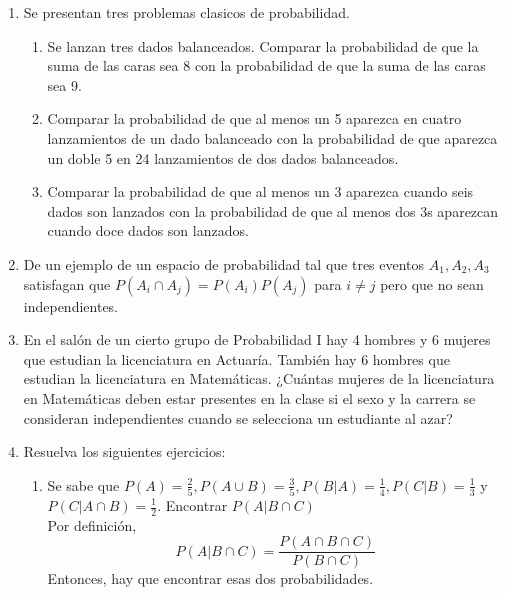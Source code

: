 \documentclass[12pt,a4paper]{report}
\begin{document}
\begin{enumerate}
   \item {
    Se presentan tres problemas clasicos de probabilidad.

    \begin{enumerate}[label=\alph*) ]
    \item{Se lanzan tres dados balanceados. Comparar la probabilidad de que la suma de las caras sea 8 con la probabilidad de que la suma de las caras sea 9.
    }\\

    \item{Comparar la probabilidad de que al menos un 5 aparezca en cuatro lanzamientos de un dado balanceado con la probabilidad de que aparezca un doble 5 en 24 lanzamientos de dos dados balanceados.} \\
    \item{Comparar la probabilidad de que al menos un 3 aparezca cuando seis dados son lanzados con la probabilidad de que al menos dos 3s aparezcan cuando doce dados son lanzados.}
    \end{enumerate}
	}


   \item {
   De un ejemplo de un espacio de probabilidad tal que tres eventos $A_{1},A_{2},A_{3}$ satisfagan que $P(A_{i}\cap A_{j})=P(A_{i})P(A_{j})$ para $i\neq j$ pero que no sean independientes.\\
	}

   \item {En el salón de un cierto grupo de Probabilidad I hay 4 hombres y 6 mujeres que estudian la licenciatura en Actuaría. También hay 6 hombres que estudian la licenciatura en Matemáticas. ¿Cuántas mujeres de la licenciatura en Matemáticas deben estar presentes en la clase si el sexo y la carrera se consideran independientes cuando se selecciona un estudiante al azar?
	}

  \item{

		 Resuelva los siguientes ejercicios:\\
		 \begin{enumerate}[label=\alph*) ]
		 \item{
			Se sabe que $P(A)= \frac{2}{5},P(A\cup B)=\frac{3}{5},P(B|A)=\frac{1}{4},P(C|B)=\frac{1}{3}$ y $P(C|A\cap B)=\frac{1}{2}$. Encontrar $P(A|B\cap C)$\\

			Por definición,
			\begin{equation*}
				P(A|B \cap C) = \frac{P(A \cap B \cap C)}{P(B \cap C)}
			\end{equation*}
			Entonces, hay que encontrar esas dos probabilidades.\\

}
\end{enumerate}}
\end{enumerate}
\end{document}
